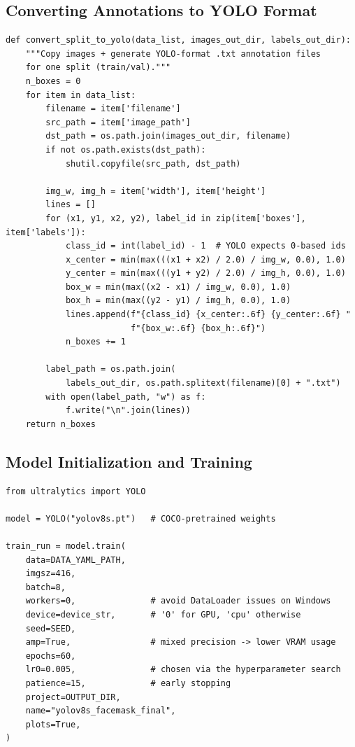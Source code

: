 \documentclass[12pt]{article}
\begin{document}
\subsection{Converting Annotations to YOLO Format}
\begin{lstlisting}
def convert_split_to_yolo(data_list, images_out_dir, labels_out_dir):
    """Copy images + generate YOLO-format .txt annotation files
    for one split (train/val)."""
    n_boxes = 0
    for item in data_list:
        filename = item['filename']
        src_path = item['image_path']
        dst_path = os.path.join(images_out_dir, filename)
        if not os.path.exists(dst_path):
            shutil.copyfile(src_path, dst_path)

        img_w, img_h = item['width'], item['height']
        lines = []
        for (x1, y1, x2, y2), label_id in zip(item['boxes'], item['labels']):
            class_id = int(label_id) - 1  # YOLO expects 0-based ids
            x_center = min(max(((x1 + x2) / 2.0) / img_w, 0.0), 1.0)
            y_center = min(max(((y1 + y2) / 2.0) / img_h, 0.0), 1.0)
            box_w = min(max((x2 - x1) / img_w, 0.0), 1.0)
            box_h = min(max((y2 - y1) / img_h, 0.0), 1.0)
            lines.append(f"{class_id} {x_center:.6f} {y_center:.6f} "
                         f"{box_w:.6f} {box_h:.6f}")
            n_boxes += 1

        label_path = os.path.join(
            labels_out_dir, os.path.splitext(filename)[0] + ".txt")
        with open(label_path, "w") as f:
            f.write("\n".join(lines))
    return n_boxes
\end{lstlisting}

\subsection{Model Initialization and Training}
\begin{lstlisting}
from ultralytics import YOLO

model = YOLO("yolov8s.pt")   # COCO-pretrained weights

train_run = model.train(
    data=DATA_YAML_PATH,
    imgsz=416,
    batch=8,
    workers=0,               # avoid DataLoader issues on Windows
    device=device_str,       # '0' for GPU, 'cpu' otherwise
    seed=SEED,
    amp=True,                # mixed precision -> lower VRAM usage
    epochs=60,
    lr0=0.005,               # chosen via the hyperparameter search
    patience=15,             # early stopping
    project=OUTPUT_DIR,
    name="yolov8s_facemask_final",
    plots=True,
)
\end{lstlisting}
\end{document}
